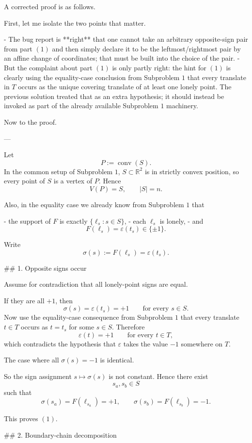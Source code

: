 A corrected proof is as follows.

First, let me isolate the two points that matter.

- The bug report is **right** that one cannot take an arbitrary opposite-sign pair from part \( (1)\) and then simply declare it to be the leftmost/rightmost pair by an affine change of coordinates; that must be built into the choice of the pair.
- But the complaint about part \( (1)\) is only partly right: the hint for \( (1)\) is clearly using the equality-case conclusion from Subproblem \(1\) that every translate in \(T\) occurs as the unique covering translate of at least one lonely point. The previous solution treated that as an extra hypothesis; it should instead be invoked as part of the already available Subproblem \(1\) machinery.

Now to the proof.

---

Let
\[
P:=\operatorname{conv}(S).
\]
In the common setup of Subproblem \(1\), \(S\subset \mathbb{R}^2\) is in strictly convex position, so every point of \(S\) is a vertex of \(P\). Hence
\[
V(P)=S,\qquad |S|=n.
\]

Also, in the equality case we already know from Subproblem \(1\) that

- the support of \(F\) is exactly \(\{\ell_s:s\in S\}\),
- each \(\ell_s\) is lonely,
- and
  \[
  F(\ell_s)=\varepsilon(t_s)\in\{\pm 1\}.
  \]

Write
\[
\sigma(s):=F(\ell_s)=\varepsilon(t_s).
\]

## 1. Opposite signs occur

Assume for contradiction that all lonely-point signs are equal.

If they are all \(+1\), then
\[
\sigma(s)=\varepsilon(t_s)=+1\qquad\text{for every }s\in S.
\]
Now use the equality-case consequence from Subproblem \(1\) that every translate \(t\in T\) occurs as \(t=t_s\) for some \(s\in S\). Therefore
\[
\varepsilon(t)=+1\qquad\text{for every }t\in T,
\]
which contradicts the hypothesis that \(\varepsilon\) takes the value \(-1\) somewhere on \(T\).

The case where all \(\sigma(s)=-1\) is identical.

So the sign assignment \(s\mapsto \sigma(s)\) is not constant. Hence there exist
\[
s_a,s_b\in S
\]
such that
\[
\sigma(s_a)=F(\ell_{s_a})=+1,\qquad
\sigma(s_b)=F(\ell_{s_b})=-1.
\]

This proves \( (1)\).

## 2. Boundary-chain decomposition

